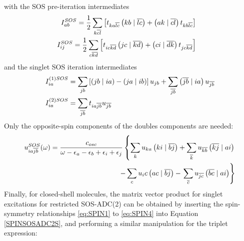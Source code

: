 \noindent with the SOS pre-iteration intermediates 
\begin{align}
\begin{split}
I_{ab}^{SOS} &= \frac{1}{2} \sum_{k\overline{cl}} \left[ t_{ka\overline{lc}} \left( kb \mid \overline{lc} \right) + \left( ak \mid \overline{cl} \right) t_{kb\overline{lc}} \right]
\end{split}
\\
\begin{split}
I_{ij}^{SOS} &= \frac{1}{2} \sum_{c\overline{kd}} \left[ t_{ic\overline{kd}} \left( jc \mid \overline{kd} \right) + \left( ci \mid \overline{dk} \right) t_{jc\overline{kd}} \right]  
\end{split}
\end{align}
\noindent and the singlet SOS iteration intermediates
\begin{align}
I_{ia}^{(1)SOS} &= \sum_{jb} \left[ \left( jb \mid ia \right) - \left( ja \mid ib \right) \right] u_{jb} + \sum_{\overline{jb}} \left( \overline{jb} \mid ia \right) u_{\overline{jb}}
\\
I_{ia}^{(2)SOS} &= \sum_{\overline{jb}} t_{ia\overline{jb}} u_{\overline{jb}}
\end{align}
\noindent Only the opposite-spin components of the doubles components are needed:
\begin{equation}
\begin{split}
u_{ia\overline{jb}}^{SOS}(\omega) = \frac{c_{osc}}{\omega - \epsilon_a - \epsilon_b + \epsilon_i + \epsilon_j} \left\lbrace \sum_k u_{ka} \left( ki \mid \overline{bj} \right) + \sum_{\overline{k}} u_{\overline{kb}} \left( \overline{kj} \mid ai \right) \right. \\ - \sum_c u_ic \left( ac \mid \overline{bj} \right) - \left. \sum_{\overline{c}} u_{\overline{jc}} \left( \overline{bc} \mid ai \right) \right\rbrace
\end{split}
\end{equation}
\noindent Finally, for closed-shell molecules, the matrix vector product for singlet excitations for restricted SOS-ADC(2) can be obtained by inserting the spin-symmetry relationships \ref{eq:SPIN1} to \ref{eq:SPIN4} into Equation \ref{SPINSOSADC2S}, and performing a similar manipulation for the triplet expression:
